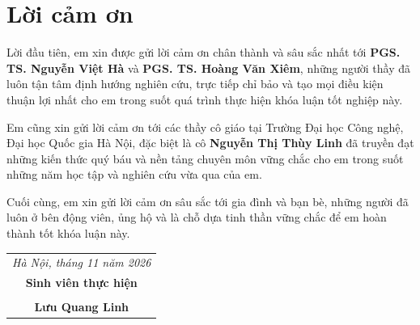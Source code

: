 \chapter*{Lời cảm ơn}
\thispagestyle{empty}

Lời đầu tiên, em xin được gửi lời cảm ơn chân thành và sâu sắc nhất tới \textbf{PGS. TS. Nguyễn Việt Hà} và \textbf{PGS. TS. Hoàng Văn Xiêm}, những người thầy đã luôn tận tâm định hướng nghiên cứu, trực tiếp chỉ bảo và tạo mọi điều kiện thuận lợi nhất cho em trong suốt quá trình thực hiện khóa luận tốt nghiệp này.

Em cũng xin gửi lời cảm ơn tới các thầy cô giáo tại Trường Đại học Công nghệ, Đại học Quốc gia Hà Nội, đặc biệt là cô \textbf{Nguyễn Thị Thùy Linh} đã truyền đạt những kiến thức quý báu và nền tảng chuyên môn vững chắc cho em trong suốt những năm học tập và nghiên cứu vừa qua của em.

Cuối cùng, em xin gửi lời cảm ơn sâu sắc tới gia đình và bạn bè, những người đã luôn ở bên động viên, ủng hộ và là chỗ dựa tinh thần vững chắc để em hoàn thành tốt khóa luận này.

\vspace{1.5cm}
\begin{flushright}
\begin{tabular}{c}
\textit{Hà Nội, tháng 11 năm 2026} \\
\textbf{Sinh viên thực hiện} \\
\vspace{2cm} \\
\textbf{Lưu Quang Linh}
\end{tabular}
\end{flushright}
